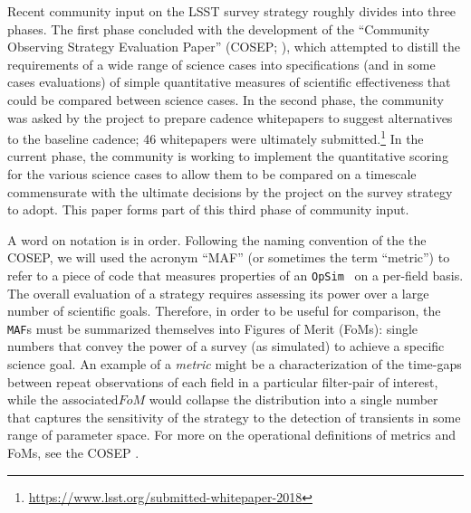 \documentclass[onecolumn, 10pt]{aastex63}
\newcommand{\opsim}{\texttt{OpSim}}
\begin{document}
{Recent community input on the LSST survey strategy roughly divides into three phases. The first phase concluded with the development of the ``Community Observing Strategy Evaluation Paper'' (COSEP; \citealt{cosep}), which attempted to distill the requirements of a wide range of science cases into specifications (and in some cases evaluations) of simple quantitative measures of scientific effectiveness that could be compared between science cases. In the second phase,  the community was asked by the project to prepare cadence whitepapers to suggest alternatives to the baseline cadence; 46 whitepapers were ultimately submitted.\footnote{\url{https://www.lsst.org/submitted-whitepaper-2018}} In the current phase, the community is working to implement the quantitative scoring for the various science cases to allow them to be compared on a timescale commensurate with the ultimate decisions by the project on the survey strategy to adopt. This paper forms part of this third phase of community input.}

{A word on notation is in order. Following the naming convention of the the COSEP, we will used the acronym ``MAF'' (or sometimes the term ``metric'') to refer to a piece of code that measures properties of an \opsim~ on a per-field basis. The overall evaluation of a strategy requires assessing its power over a large number of scientific goals. Therefore, in order to be useful for comparison, the \texttt{MAF}s must be summarized themselves into Figures of Merit (FoMs): single numbers that convey the power of a survey (as simulated) to achieve a specific science goal. An example of a {\it metric} might be a characterization of the time-gaps between repeat observations of each field in a particular filter-pair of interest, while the associated$FoM$ would collapse the distribution into a single number that captures the sensitivity of the strategy to the detection of transients in some range of parameter space. For more on the operational definitions of metrics and FoMs, see the COSEP \citep{cosep}. }
\end{document}
